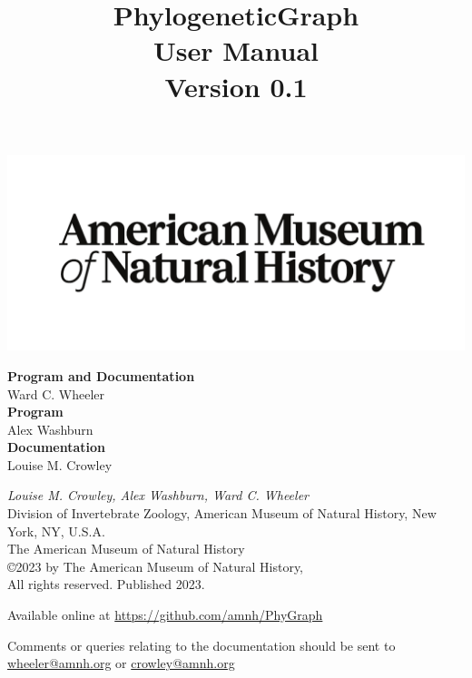 \documentclass[11pt]{book}
\begin{document}
	
	\title{PhylogeneticGraph\\User Manual\\Version 0.1}
	
	\maketitle
	
	\newpage

	 \begin{center}
		\includegraphics[width=\textwidth]{AMNHLogo.pdf}
	\end{center}

	\vspace*{2.50cm}	
	\begin{flushleft}
		\textbf {Program and Documentation} \\ Ward C. Wheeler \\
		\vspace*{0.50cm}
		\textbf {Program} \\ Alex Washburn \\
		\vspace*{0.50cm}
		\textbf{Documentation} \\ Louise M. Crowley
	\end{flushleft}
	
	\vspace*{2.50cm}
	
	\begin{flushleft}
		\small
		{\it Louise M. Crowley, Alex Washburn, Ward C. Wheeler} \\
		
		Division of Invertebrate Zoology, American Museum of Natural History, New York, NY, U.S.A.\\
		\smallskip
		The American Museum of Natural History\\
		\copyright 2023 by The American Museum of Natural History, \\
		All rights reserved. Published 2023.
		
		\vspace*{0.25cm}
		
		Available online at \url{https://github.com/amnh/PhyGraph}
		
		Comments or queries relating to the documentation should be sent to \href{mailto:wheeler@amnh.org}
		{wheeler@amnh.org} or \href{mailto:crowley@amnh.org}{crowley@amnh.org}
	\end{flushleft}
	
\end{document}
